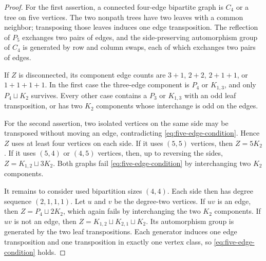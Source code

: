 \documentclass[11pt]{amsart}
\begin{document}
\begin{proof}
For the first assertion, a connected four-edge bipartite graph is
$C_4$ or a tree on five vertices. The two nonpath trees have two leaves
with a common neighbor; transposing those leaves induces one edge
transposition. The reflection of $P_5$ exchanges two pairs of edges,
and the side-preserving automorphism group of $C_4$ is generated by
row and column swaps, each of which exchanges two pairs of edges.

If $Z$ is disconnected, its component edge counts are $3+1$, $2+2$,
$2+1+1$, or $1+1+1+1$. In the first case the three-edge component is
$P_4$ or $K_{1,3}$, and only $P_4\sqcup K_2$ survives. Every other case
contains a $P_3$ or $K_{1,3}$ with an odd leaf transposition, or has two
$K_2$ components whose interchange is odd on the edges.

For the second assertion, two isolated vertices on the same side may
be transposed without moving an edge, contradicting
\eqref{eq:five-edge-condition}. Hence $Z$ uses at least four vertices
on each side. If it uses $(5,5)$ vertices, then $Z=5K_2$. If it uses
$(5,4)$ or $(4,5)$ vertices, then, up to reversing the sides,
$Z=K_{1,2}\sqcup3K_2$. Both graphs fail
\eqref{eq:five-edge-condition} by interchanging two $K_2$ components.

It remains to consider used bipartition sizes $(4,4)$. Each side then
has degree sequence $(2,1,1,1)$. Let $u$ and $v$ be the degree-two
vertices. If $uv$ is an edge, then $Z=P_4\sqcup2K_2$, which again fails
by interchanging the two $K_2$ components. If $uv$ is not an edge,
then $Z=K_{1,2}\sqcup K_{2,1}\sqcup K_2$. Its automorphism group is
generated by the two leaf transpositions. Each generator induces one
edge transposition and one transposition in exactly one vertex class,
so \eqref{eq:five-edge-condition} holds.
\end{proof}
\end{document}

